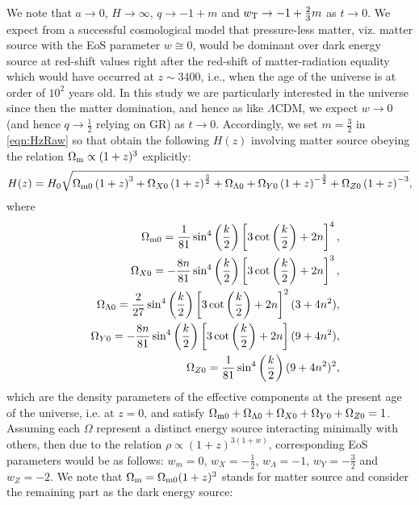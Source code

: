 \documentclass[11pt,a4paper]{article}
\begin{document}
We note that $a\rightarrow 0$, $H\rightarrow\infty$, $q\rightarrow-1+m$ and $w_{\rm T}\rightarrow-1+\frac{2}{3}m$ as $t\rightarrow 0$. We expect from a successful cosmological model that pressure-less matter, viz. matter source with the EoS parameter $w\cong 0$, would be dominant over dark energy source at red-shift values right after the red-shift of matter-radiation equality which would have occurred at $z\sim 3400$, i.e., when the age of the universe is at order of $10^{2}$ years old. In this study we are particularly interested in the universe since then the matter domination, and hence as like $\Lambda$CDM, we expect $w\rightarrow0$ (and hence $q\rightarrow\frac{1}{2}$ relying on GR) as $t\rightarrow 0$. Accordingly, we set $m=\frac{3}{2}$ in \eqref{eqn:HzRaw} so that obtain the following $H(z)$ involving matter source obeying the relation $\Omega_{{\rm m}}\propto (1+z)^3$ explicitly:
\begin{equation}
\label{eqn:Hzfull}
H(z)=H_{0}\sqrt{\Omega_{\rm m0}\left(1+z\right)^{3}+\Omega_{X0}\left(1+z\right)^{\frac{3}{2}}+\Omega_{\Lambda 0}+\Omega_{Y0}\left(1+z\right)^{-\frac{3}{2}}+\Omega_{Z0}\left(1+z\right)^{-3}},
\end{equation}
where
\begin{eqnarray}\nonumber
\label{HZcsina}
&&\Omega_{{\rm m}0}=\frac{1}{81}\sin^{4}\left(\frac{k}{2}\right)\left[3\cot\left(\frac{k}{2}\right)+2n\right]^4,\\
\nonumber
&&\Omega_{X0}=-\frac{8n}{81}\sin^{4}\left(\frac{k}{2}\right)\left[3\cot\left(\frac{k}{2}\right)+2n\right]^3,\\
\nonumber
&&\Omega_{\Lambda 0}=\frac{2}{27}\sin^{4}\left(\frac{k}{2}\right)\left[3\cot\left(\frac{k}{2}\right)+2n\right]^2(3+4n^2),\\
\nonumber
&&\Omega_{Y0}=-\frac{8n}{81}\sin^{4}\left(\frac{k}{2}\right)\left[3\cot\left(\frac{k}{2}\right)+2n\right] (9+4n^2),\\
\nonumber
&&\Omega_{Z0}=\frac{1}{81}\sin^{4}\left(\frac{k}{2}\right)(9+4n^2)^2,
\end{eqnarray}
which are the density parameters of the effective components at the present age of the universe, i.e. at $z=0$, and satisfy $\Omega_{{\rm m}0}+\Omega_{\Lambda 0}+\Omega_{X0}+\Omega_{Y0}+\Omega_{Z0}=1$. Assuming each $\Omega$ represent a distinct energy source interacting minimally with others, then due to the relation $\rho\propto (1+z)^{3(1+w)}$, corresponding EoS parameters would be as follows: $w_{m}=0$, $w_{X}=-\frac{1}{2}$, $w_{\Lambda}=-1$, $w_{Y}=-\frac{3}{2}$ and $w_{Z}=-2$. We note that $\Omega_{{\rm m}}=\Omega_{{\rm m}0}(1+z)^{3}$ stands for matter source and consider the remaining part as the dark energy source:
\end{document}
